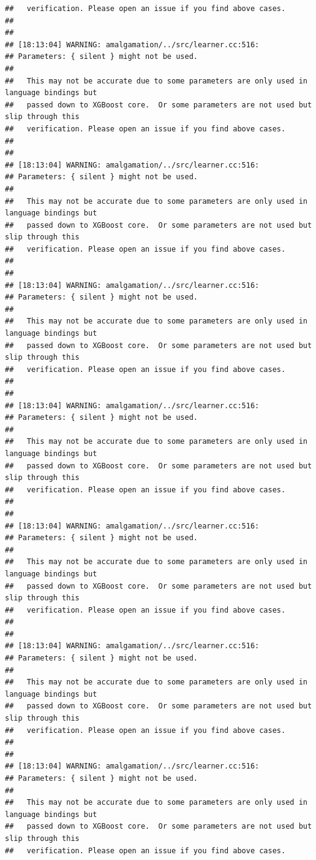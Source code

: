 \documentclass[AMS,STIX2COL]{WileyNJD-v2}\usepackage[]{graphicx}\usepackage[]{color}
\makeatletter
\newenvironment{kframe}{%
 \def\at@end@of@kframe{}%
 \ifinner\ifhmode%
  \def\at@end@of@kframe{\end{minipage}}%
  \begin{minipage}{\columnwidth}%
 \fi\fi%
 \def\FrameCommand##1{\hskip\@totalleftmargin \hskip-\fboxsep
 \colorbox{shadecolor}{##1}\hskip-\fboxsep
     \hskip-\linewidth \hskip-\@totalleftmargin \hskip\columnwidth}%
 \MakeFramed {\advance\hsize-\width
   \@totalleftmargin\z@ \linewidth\hsize
   \@setminipage}}%
 {\par\unskip\endMakeFramed%
 \at@end@of@kframe}
\newenvironment{knitrout}{}{} %
\makeatother
\begin{document}
\begin{knitrout}
\begin{kframe}
\begin{verbatim}
##   verification. Please open an issue if you find above cases.
## 
## 
## [18:13:04] WARNING: amalgamation/../src/learner.cc:516: 
## Parameters: { silent } might not be used.
## 
##   This may not be accurate due to some parameters are only used in language bindings but
##   passed down to XGBoost core.  Or some parameters are not used but slip through this
##   verification. Please open an issue if you find above cases.
## 
## 
## [18:13:04] WARNING: amalgamation/../src/learner.cc:516: 
## Parameters: { silent } might not be used.
## 
##   This may not be accurate due to some parameters are only used in language bindings but
##   passed down to XGBoost core.  Or some parameters are not used but slip through this
##   verification. Please open an issue if you find above cases.
## 
## 
## [18:13:04] WARNING: amalgamation/../src/learner.cc:516: 
## Parameters: { silent } might not be used.
## 
##   This may not be accurate due to some parameters are only used in language bindings but
##   passed down to XGBoost core.  Or some parameters are not used but slip through this
##   verification. Please open an issue if you find above cases.
## 
## 
## [18:13:04] WARNING: amalgamation/../src/learner.cc:516: 
## Parameters: { silent } might not be used.
## 
##   This may not be accurate due to some parameters are only used in language bindings but
##   passed down to XGBoost core.  Or some parameters are not used but slip through this
##   verification. Please open an issue if you find above cases.
## 
## 
## [18:13:04] WARNING: amalgamation/../src/learner.cc:516: 
## Parameters: { silent } might not be used.
## 
##   This may not be accurate due to some parameters are only used in language bindings but
##   passed down to XGBoost core.  Or some parameters are not used but slip through this
##   verification. Please open an issue if you find above cases.
## 
## 
## [18:13:04] WARNING: amalgamation/../src/learner.cc:516: 
## Parameters: { silent } might not be used.
## 
##   This may not be accurate due to some parameters are only used in language bindings but
##   passed down to XGBoost core.  Or some parameters are not used but slip through this
##   verification. Please open an issue if you find above cases.
## 
## 
## [18:13:04] WARNING: amalgamation/../src/learner.cc:516: 
## Parameters: { silent } might not be used.
## 
##   This may not be accurate due to some parameters are only used in language bindings but
##   passed down to XGBoost core.  Or some parameters are not used but slip through this
##   verification. Please open an issue if you find above cases.

\end{verbatim}
\end{kframe}
\end{knitrout}
\end{document}
